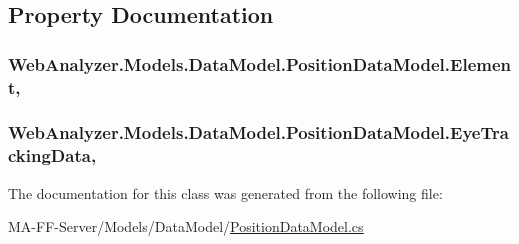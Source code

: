 \subsection{Property Documentation}
\hypertarget{class_web_analyzer_1_1_models_1_1_data_model_1_1_position_data_model_a4825afc0a1ecf3eeb0876be8611111ba}{}
\subsubsection[{Element}]{ Web\+Analyzer.\+Models.\+Data\+Model.\+Position\+Data\+Model.\+Element\hspace{0.3cm}{\ttfamily [get]}, {\ttfamily [set]}}\label{class_web_analyzer_1_1_models_1_1_data_model_1_1_position_data_model_a4825afc0a1ecf3eeb0876be8611111ba}
\hypertarget{class_web_analyzer_1_1_models_1_1_data_model_1_1_position_data_model_a06815dcd63aca4dcd91f2d5346f03afd}{}
\subsubsection[{Eye\+Tracking\+Data}]{ Web\+Analyzer.\+Models.\+Data\+Model.\+Position\+Data\+Model.\+Eye\+Tracking\+Data\hspace{0.3cm}{\ttfamily [get]}, {\ttfamily [set]}}\label{class_web_analyzer_1_1_models_1_1_data_model_1_1_position_data_model_a06815dcd63aca4dcd91f2d5346f03afd}


The documentation for this class was generated from the following file\+:\begin{DoxyCompactItemize}
\item 
M\+A-\/\+F\+F-\/\+Server/\+Models/\+Data\+Model/\hyperlink{_position_data_model_8cs}{Position\+Data\+Model.\+cs}\end{DoxyCompactItemize}
